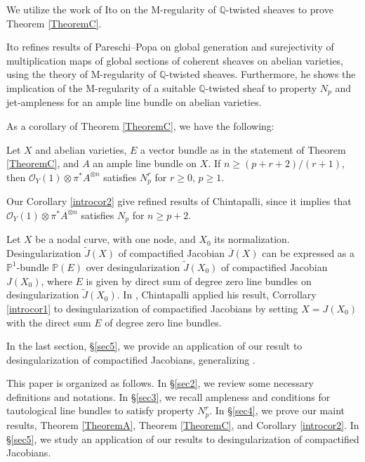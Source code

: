 \documentclass[11pt,letter]{amsart}
\numberwithin{equation}{section}
\begin{document}
We utilize the work of Ito \cite{Ito22} on the M-regularity of $\mathbb{Q}$-twisted sheaves to prove Theorem \ref{TheoremC}.

   Ito \cite{Ito22} refines results of Pareschi--Popa \cite{PP03,PP11} on global generation and surejectivity of multiplication maps of global sections of coherent sheaves on abelian varieties, using the theory of M-regularity of $\mathbb{Q}$-twisted sheaves. Furthermore, he shows the implication of the M-regularity of a suitable $\mathbb{Q}$-twisted sheaf to property $N_p$ and jet-ampleness for an ample line bundle on abelian varieties. 
   
   
As a corollary of Theorem \ref{TheoremC}, we have the following:
\begin{introcor}\label{introcor2}
  Let $X$ and abelian varieties, $E$ a vector bundle as in the statement of Theorem \ref{TheoremC}, and $A$ an ample line bundle on $X$. If $n\geq (p+r+2)/(r+1)$, then $\mathcal{O}_Y(1)\otimes\pi^* A^{\otimes n}$ satisfies $N_p^r$ for $r\geq 0$, $p\geq 1$.
  \end{introcor}

  Our Corollary \ref{introcor2} give refined results of Chintapalli, since it implies that $\mathcal{O}_Y(1)\otimes\pi^*A^{\otimes n}$ satisfies $N_p$ for $n\geq p+2$. 
  


  
  
 Let $X$ be a nodal curve, with one node, and $X_0$ its normalization. Desingularization $\widetilde{J}(X)$ of compactified Jacobian $\overline{J}(X)$ can be expressed as a $\mathbb{P}^1$-bundle $\mathbb{P}(E)$ over desingularization $\widetilde{J}(X_0)$ of compactified Jacobian $J(X_0)$, where $E$ is given by direct sum of degree zero line bundles on desingularization $\widetilde{J}(X_0)$. In \cite[Theorem 5.4]{Chi19}, Chintapalli applied his result, Corrollary \ref{introcor1} to desingularization of compactified Jacobians by setting $X=J(X_0)$ with the direct sum $E$ of degree zero line bundles.
 
  In the last section, \S\ref{sec5}, we provide an application of our result to desingularization of compactified Jacobians, generalizing \cite[Theorem 5.4]{Chi19}. 
  
  
  
  
  
  This paper is organized as follows. In \S\ref{sec2}, we review some necessary definitions and notations. In \S\ref{sec3}, we recall ampleness and conditions for tautological line bundles to satisfy property $N_p^r$. In \S\ref{sec4}, we prove our maint results, Theorem \ref{TheoremA}, Theorem \ref{TheoremC}, and Corollary \ref{introcor2}. In \S\ref{sec5}, we study an application of our results to desingularization of compactified Jacobians.
  
\end{document}
